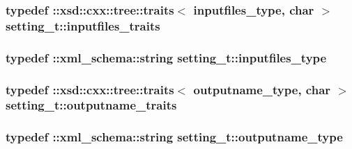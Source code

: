 \subsubsection[{\texorpdfstring{inputfiles\+\_\+traits}{inputfiles_traits}}]{\setlength{\rightskip}{0pt plus 5cm}typedef \+::xsd\+::cxx\+::tree\+::traits$<$ {\bf inputfiles\+\_\+type}, char $>$ {\bf setting\+\_\+t\+::inputfiles\+\_\+traits}}\hypertarget{classsetting__t_a71049fe8358aa247607006a6bfe661b5}{}\label{classsetting__t_a71049fe8358aa247607006a6bfe661b5}
\subsubsection[{\texorpdfstring{inputfiles\+\_\+type}{inputfiles_type}}]{\setlength{\rightskip}{0pt plus 5cm}typedef \+::{\bf xml\+\_\+schema\+::string} {\bf setting\+\_\+t\+::inputfiles\+\_\+type}}\hypertarget{classsetting__t_a9775dbebbc97cf7465126aa14870147d}{}\label{classsetting__t_a9775dbebbc97cf7465126aa14870147d}
\subsubsection[{\texorpdfstring{outputname\+\_\+traits}{outputname_traits}}]{\setlength{\rightskip}{0pt plus 5cm}typedef \+::xsd\+::cxx\+::tree\+::traits$<$ {\bf outputname\+\_\+type}, char $>$ {\bf setting\+\_\+t\+::outputname\+\_\+traits}}\hypertarget{classsetting__t_ae26e11d5332e659cec4e08d78cd65bbd}{}\label{classsetting__t_ae26e11d5332e659cec4e08d78cd65bbd}
\subsubsection[{\texorpdfstring{outputname\+\_\+type}{outputname_type}}]{\setlength{\rightskip}{0pt plus 5cm}typedef \+::{\bf xml\+\_\+schema\+::string} {\bf setting\+\_\+t\+::outputname\+\_\+type}}\hypertarget{classsetting__t_a176d76dc9ab1b149c679035ce0aa5448}{}\label{classsetting__t_a176d76dc9ab1b149c679035ce0aa5448}
